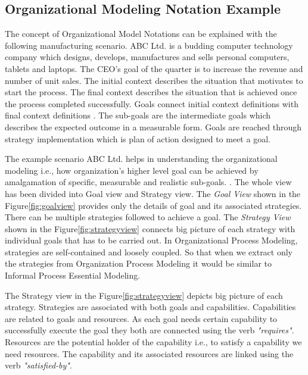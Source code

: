 \subsection{Organizational Modeling Notation Example}
\hspace{4ex} The concept of Organizational Model Notations can be explained with the following manufacturing scenario. ABC Ltd. is a budding computer technology company which designs, develops, manufactures and sells personal computers, tablets and laptops. The CEO's goal of the quarter is to increase the revenue and number of unit sales. The initial context describes the situation that motivates to start the process. The final context describes the situation that is achieved once the process completed successfully. Goals connect initial context definitions with final context definitions \cite{Sungur2014a}. The sub-goals are the intermediate goals which describes the expected outcome in a measurable form. Goals are reached through strategy implementation which is plan of action designed to meet a goal. 

\hspace{4ex} The example scenario ABC Ltd. helps in understanding the organizational modeling i.e., how organization's higher level goal can be achieved by amalgamation of specific, measurable and realistic sub-goals. . The whole view has been divided into Goal view and Strategy view. The \textit{Goal View} shown in the Figure\ref{fig:goalview} provides only the details of goal and its associated strategies. There can be multiple strategies followed to achieve a goal. The \textit{Strategy View} shown in the Figure\ref{fig:strategyview} connects big picture of each strategy with individual goals that has to be carried out. In Organizational Process Modeling, strategies are self-contained and loosely coupled. So that when we extract only the strategies from Organization Process Modeling it would be similar to Informal Process Essential Modeling. 

\hspace{4ex} The Strategy view  in the Figure\ref{fig:strategyview} depicts big picture of each strategy. Strategies are associated with both goals and capabilities. Capabilities are related to goals and resources. As each goal needs certain capability to successfully execute the goal they both are connected using the verb \textit{"requires"}. Resources are the potential holder of the capability i.e., to satisfy a capability we need resources. The capability and its associated resources are linked using the verb \textit{"satisfied-by"}. 



